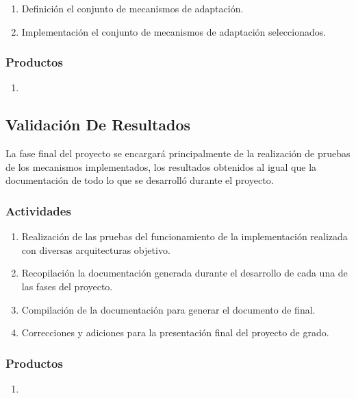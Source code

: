 \begin{enumerate}
    \itemsep-2mm
    \item Definición el conjunto de mecanismos de adaptación.
    \item Implementación el conjunto de mecanismos de adaptación seleccionados.
\end{enumerate}  

\subsubsection*{Productos}

\begin{enumerate}
    \itemsep-2mm
    \item 
\end{enumerate}

\subsection{Validación De Resultados}

La fase final del proyecto se encargará principalmente de la realización de pruebas de los mecanismos implementados, los resultados obtenidos al igual que la documentación de todo lo que se desarrolló durante el proyecto.

\subsubsection*{Actividades}

\begin{enumerate}
    \itemsep-2mm
    \item Realización de las pruebas del funcionamiento de la implementación realizada con diversas arquitecturas objetivo.
    \item Recopilación la documentación generada durante el desarrollo de cada una de las fases del proyecto.
    \item Compilación de la documentación para generar el documento de final.
    \item Correcciones y adiciones para la presentación final del proyecto de grado.
\end{enumerate}  

\subsubsection*{Productos}

\begin{enumerate}
    \itemsep-2mm
    \item 
\end{enumerate}